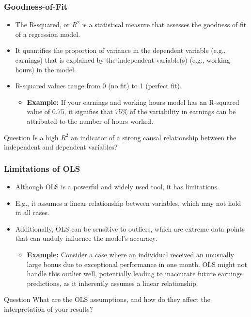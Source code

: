 \documentclass[notes,10pt, aspectratio=169]{beamer}
\begin{document}
\begin{frame}
\frametitle{Goodness-of-Fit}
\begin{itemize}
    \item  The R-squared, or $R^2$ is a statistical measure that assesses the goodness of fit of a regression model.\vspace{1em}
    \item It quantifies the proportion of variance in the dependent variable (e.g., earnings) that is explained by the independent variable(s) (e.g., working hours) in the model.\vspace{1em}
    \item R-squared values range from 0 (no fit) to 1 (perfect fit).\vspace{1em}
    \begin{itemize}
        \item \textbf{Example:} If your earnings and working hours model has an R-squared value of 0.75, it signifies that 75\% of the variability in earnings can be attributed to the number of hours worked.
    \end{itemize}
\end{itemize}

\begin{exampleblock}{Question}
Is a high $R^2$ an indicator of a strong causal relationship between the independent and dependent variables?
\end{exampleblock}

\end{frame}

\begin{frame}
\frametitle{Limitations of OLS}
\begin{itemize}
    \item Although OLS is a powerful and widely used tool, it has limitations.\vspace{1em}
    \item E.g., it assumes a linear relationship between variables, which may not hold in all cases.\vspace{1em}
    \item Additionally, OLS can be sensitive to outliers, which are extreme data points that can unduly influence the model's accuracy.\vspace{1em}
 \begin{itemize}
        \item \textbf{Example:} Consider a case where an individual received an unusually large bonus due to exceptional performance in one month. OLS might not handle this outlier well, potentially leading to inaccurate future earnings predictions, as it inherently assumes a linear relationship.
    \end{itemize}
\end{itemize}

\begin{exampleblock}{Question}
 What are the OLS assumptions, and how do they affect the interpretation of your results?
\end{exampleblock}

\end{frame}
\end{document}
